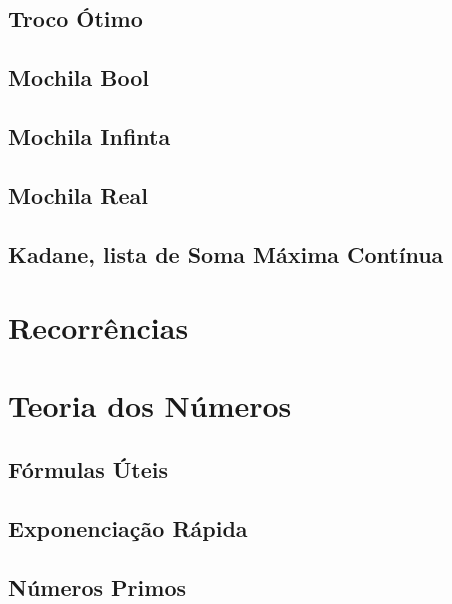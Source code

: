         \subsection{Troco Ótimo}
            
            \newpage
        \subsection{Mochila Bool}
            
        \subsection{Mochila Infinta}
            
            \newpage
        \subsection{Mochila Real}
            
        \subsection{Kadane, lista de Soma Máxima Contínua}
            
    
    \section{Recorrências}
        
        \newpage
    
    \section{Teoria dos Números}
        \subsection{Fórmulas Úteis}
            
        \subsection{Exponenciação Rápida}
            
            \newpage
        \subsection{Números Primos}
            
            \newpage
